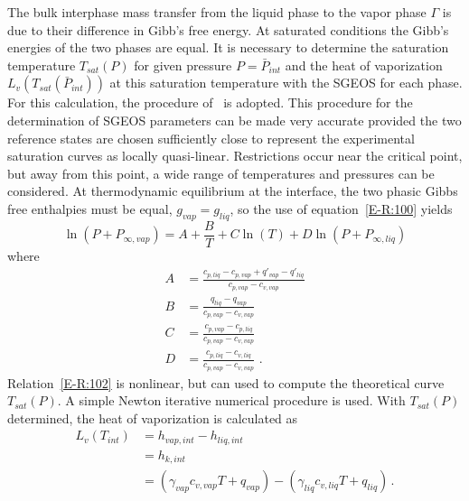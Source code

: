 The bulk interphase mass transfer from the liquid phase to the vapor
phase $\Gamma$ is due to their difference in Gibb's free energy.  At
saturated conditions the Gibb's energies of the two phases are equal.
It is necessary to determine the saturation temperature $T_{sat}(P)$
for given pressure $P=\bar{P}_{int}$ and the heat of vaporization
$L_v\left(T_{sat}(\bar{P}_{int}) \right)$ at this saturation temperature
with the SGEOS for each phase.  For this calculation, the procedure
of~\cite{SGEOS} is adopted.  This procedure for the
determination of SGEOS parameters can be made very accurate provided
the two reference states are chosen sufficiently close to represent
the experimental saturation curves as locally quasi-linear.
Restrictions occur near the critical point, but away from this point,
a wide range of temperatures and pressures can be considered.  At
thermodynamic equilibrium at the interface, the two phasic Gibbs free
enthalpies must be equal, $g_{vap}=g_{liq}$, so the use of equation~\eqref{E-R:100}
yields
\begin{equation}
  \label{E-R:102}
  \ln \left( P + P_{\infty,  vap} \right) = A + \frac{B}{T} + C  \ln(T) + D  \ln \left( P + P_{\infty,  liq} \right)
\end{equation}
where
\begin{align}
  A &= \frac{c_{p, liq} - c_{p, vap} + q'_{vap} - q'_{liq}}{c_{p,  vap} - c_{v,  vap}} \\
  B &= \frac{q_{liq}-q_{vap}}{c_{p,  vap} - c_{v,  vap}} \\
  C &= \frac{c_{p, vap} - c_{p, liq}}{c_{p,  vap} - c_{v,  vap}} \\
  D &= \frac{c_{p, liq} - c_{v, liq}}{c_{p,  vap} - c_{v,  vap}} \,\,.
\end{align}
Relation~\eqref{E-R:102} is nonlinear, but can used to compute the
theoretical curve $T_{sat}(P)$.  A simple Newton iterative numerical
procedure is used.  With $T_{sat}(P)$ determined, the heat of
vaporization is calculated as
\begin{align}
  \nonumber
  L_v \left( T_{int} \right) &= h_{vap,  int} - h_{liq,  int}
  \\
  \nonumber
  &= h_{k,  int}
  \\
  &= \left( \gamma_{vap}  c_{v, vap}  T + q_{vap} \right) - \left( \gamma_{liq}  c_{v, liq}  T + q_{liq} \right) \,.
\end{align}
%
